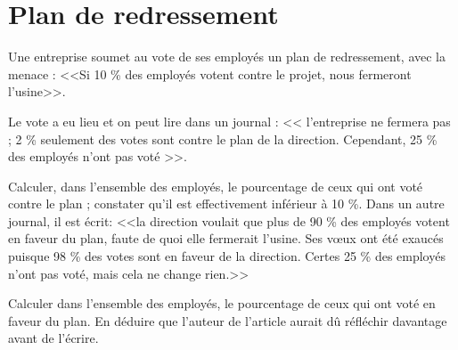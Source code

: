 \section{Plan de redressement }

Une entreprise soumet au vote de ses employés un plan de redressement, avec la menace : <<Si 10 \% des employés votent contre le projet, nous fermeront l'usine>>.

Le vote a eu lieu et on peut lire dans un journal : << l'entreprise ne fermera pas ; 2 \% seulement des votes sont contre le plan de la direction. Cependant, 25 \% des employés n'ont pas voté >>.

\begin{questions}
	\question Calculer, dans l'ensemble des employés, le pourcentage de ceux qui ont voté contre le plan ; constater qu'il est effectivement inférieur à 10 \%.
	\question Dans un autre journal, il est écrit: <<la direction voulait que plus de 90 \% des employés votent en faveur du plan, faute de quoi elle fermerait l'usine. Ses v\oe ux ont été exaucés puisque 98 \% des votes sont en faveur de la direction. Certes 25 \% des employés n'ont pas voté, mais cela ne change rien.>>
	
	Calculer dans l'ensemble des employés, le pourcentage de ceux qui ont voté en faveur du plan. En déduire que l'auteur de l'article aurait dû réfléchir davantage avant de l'écrire.  
\end{questions} 